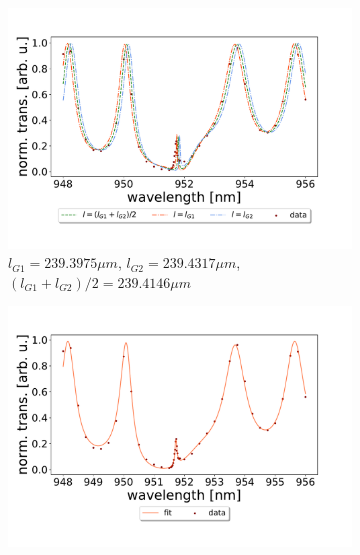 \begin{figure}[h!]
    \centering
    \begin{subfigure}[b]{0.49\textwidth}
        \centering
        \includegraphics[width=\textwidth]{figures/results/238um_long_scan_sim_comparison.pdf}
        \caption{$l_{G1} = 239.3975 \mu m$, $l_{G2} = 239.4317 \mu m$, $(l_{G1} + l_{G2})/2 = 239.4146 \mu m$}
        \label{fig:238um_long_scan_sim_comparison}
    \end{subfigure}
    \begin{subfigure}[b]{0.49\textwidth}
        \centering
        \includegraphics[width=\textwidth]{figures/results/238um_long_scan_fit.pdf}
        \caption{}
        \label{fig:238um_long_scan_fit}
    \end{subfigure}
\end{figure}

